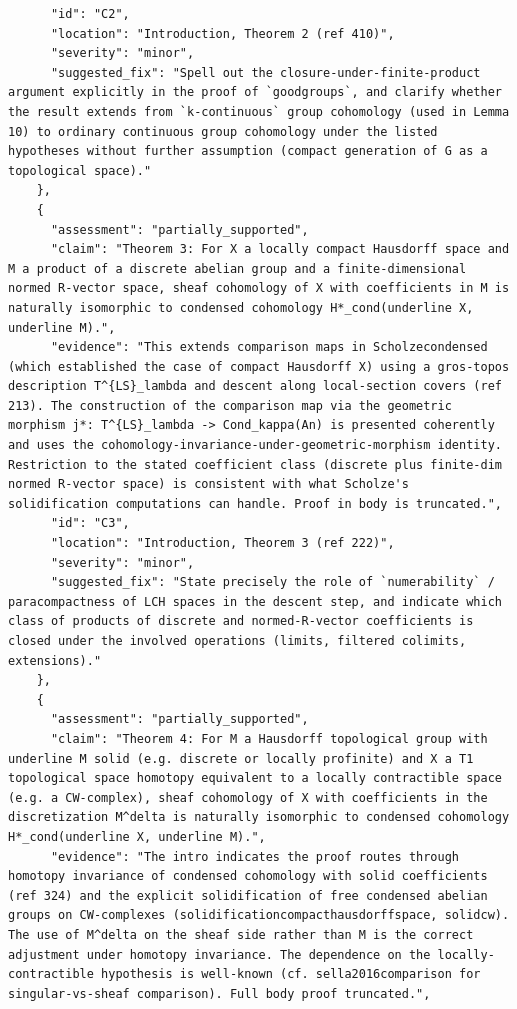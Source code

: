 \documentclass[11pt]{article}
\begin{document}
\begin{verbatim}
      "id": "C2",
      "location": "Introduction, Theorem 2 (ref 410)",
      "severity": "minor",
      "suggested_fix": "Spell out the closure-under-finite-product argument explicitly in the proof of `goodgroups`, and clarify whether the result extends from `k-continuous` group cohomology (used in Lemma 10) to ordinary continuous group cohomology under the listed hypotheses without further assumption (compact generation of G as a topological space)."
    },
    {
      "assessment": "partially_supported",
      "claim": "Theorem 3: For X a locally compact Hausdorff space and M a product of a discrete abelian group and a finite-dimensional normed R-vector space, sheaf cohomology of X with coefficients in M is naturally isomorphic to condensed cohomology H*_cond(underline X, underline M).",
      "evidence": "This extends comparison maps in Scholzecondensed (which established the case of compact Hausdorff X) using a gros-topos description T^{LS}_lambda and descent along local-section covers (ref 213). The construction of the comparison map via the geometric morphism j*: T^{LS}_lambda -> Cond_kappa(An) is presented coherently and uses the cohomology-invariance-under-geometric-morphism identity. Restriction to the stated coefficient class (discrete plus finite-dim normed R-vector space) is consistent with what Scholze's solidification computations can handle. Proof in body is truncated.",
      "id": "C3",
      "location": "Introduction, Theorem 3 (ref 222)",
      "severity": "minor",
      "suggested_fix": "State precisely the role of `numerability` / paracompactness of LCH spaces in the descent step, and indicate which class of products of discrete and normed-R-vector coefficients is closed under the involved operations (limits, filtered colimits, extensions)."
    },
    {
      "assessment": "partially_supported",
      "claim": "Theorem 4: For M a Hausdorff topological group with underline M solid (e.g. discrete or locally profinite) and X a T1 topological space homotopy equivalent to a locally contractible space (e.g. a CW-complex), sheaf cohomology of X with coefficients in the discretization M^delta is naturally isomorphic to condensed cohomology H*_cond(underline X, underline M).",
      "evidence": "The intro indicates the proof routes through homotopy invariance of condensed cohomology with solid coefficients (ref 324) and the explicit solidification of free condensed abelian groups on CW-complexes (solidificationcompacthausdorffspace, solidcw). The use of M^delta on the sheaf side rather than M is the correct adjustment under homotopy invariance. The dependence on the locally-contractible hypothesis is well-known (cf. sella2016comparison for singular-vs-sheaf comparison). Full body proof truncated.",

\end{verbatim}
\end{document}
